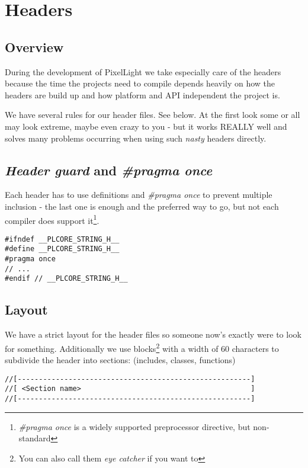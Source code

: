 \chapter{Headers}




\section{Overview}
During the development of PixelLight we take especially care of the headers because the time the projects need to compile depends heavily on how the headers are build up and how platform and API independent the project is.

We have several rules for our header files. See below. At the first look some or all may look extreme, maybe even crazy to you - but it works REALLY well and solves many problems occurring when using such \emph{nasty} headers directly.




\section{\emph{Header guard} and \emph{\#pragma once}}
Each header has to use definitions and \emph{\#pragma once} to prevent multiple inclusion - the last one is enough and the preferred way to go, but not each compiler does support it\footnote{\emph{\#pragma once} is a widely supported preprocessor directive, but non-standard}.

\begin{lstlisting}[caption=Header guard]
#ifndef __PLCORE_STRING_H__
#define __PLCORE_STRING_H__
#pragma once
// ...
#endif // __PLCORE_STRING_H__
\end{lstlisting}




\section{Layout}
We have a strict layout for the header files so someone now's exactly were to look for something. Additionally we use blocks\footnote{You can also call them \emph{eye catcher} if you want to} with a width of 60 characters to subdivide the header into sections: (includes, classes, functions)

\begin{lstlisting}[caption=Code section comment blocks]
//[-------------------------------------------------------]
//[ <Section name>                                        ]
//[-------------------------------------------------------]
\end{lstlisting}

